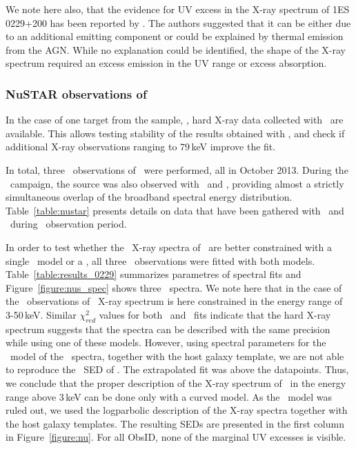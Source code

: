 We note here also, that the evidence for UV excess in the X-ray spectrum of 1ES\,0229+200 has been reported by \cite{Costamante2018}.
The authors suggested that it can be either due to an additional emitting component or could be explained by thermal emission from the AGN. 
While no explanation could be identified, the shape of the X-ray spectrum required an excess emission in the UV range or excess absorption.



\subsubsection*{NuSTAR observations of \one}
In the case of one target from the sample, \one, hard X-ray data collected with \nus\ are available. 
This allows testing stability of the results obtained with \xrt, and check if additional X-ray observations ranging to 79\,keV improve the fit. 

In total, three \nus\ observations of \one\ were performed, all in October 2013.
During the \nus\ campaign, the source was also observed with \xrt\ and \uvot, providing almost a strictly simultaneous overlap of the broadband spectral energy distribution. 
Table~\ref{table:nustar} presents details on data that have been gathered with \nus\ and \xrt\ during \nus\ observation period. 

In order to test whether the \nus\ X-ray spectra of \one\ are better constrained with a single \po\ model or a \lp, all three \nus\ observations were fitted with  both models.
Table~\ref{table:results_0229} summarizes parametres of spectral fits and Figure~\ref{figure:nus_spec} shows three \nus\ spectra. 
We note here that in the case of the  \nus\ observations of \one\ X-ray spectrum is here constrained in the energy range of 3-50\,keV. 
Similar $\chi_{red}^2$ values for both \po\ and \lp\ fits indicate that the hard X-ray spectrum suggests that the spectra can be described with the same precision while using one of these models. 
However, using spectral parameters for the \po\ model of the \nus\ spectra, together with the host galaxy template, we are not able to reproduce the \itu\ SED of \one. 
The extrapolated fit was above the datapoints. 
Thus, we conclude that the proper description of the X-ray spectrum of \one\ in the energy range above 3\,keV can be done only with a curved model. 
As the \po\ model was ruled out, we used the logparbolic description of the X-ray spectra together with the host galaxy templates. 
The resulting SEDs are presented in the first column in Figure~\ref{figure:nu}. 
For all ObsID, none of the marginal UV excesses is visible. 


